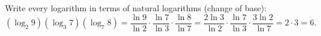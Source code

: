 Write every logarithm in terms of natural logarithms (change of base):
\[
(\log_2 9)(\log_3 7)(\log_7 8)=\dfrac{\ln 9}{\ln 2}\cdot\dfrac{\ln 7}{\ln 3}\cdot\dfrac{\ln 8}{\ln 7}
=\dfrac{2\ln 3}{\ln 2}\cdot\dfrac{\ln 7}{\ln 3}\cdot\dfrac{3\ln 2}{\ln 7}=2\cdot3=\boxed{6}.
\]
